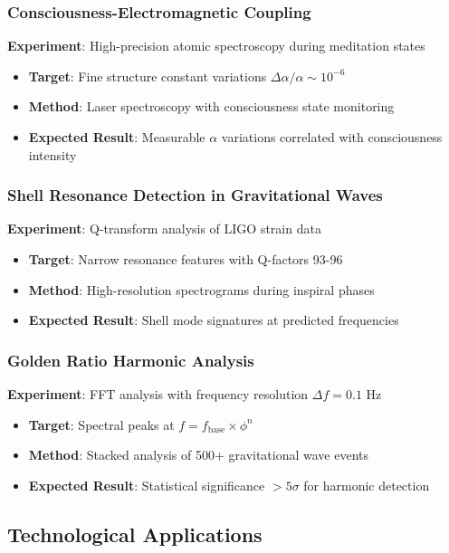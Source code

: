 \documentclass[12pt,a4paper]{article}
\theoremstyle{plain}
\theoremstyle{definition}
\begin{document}
\subsubsection{Consciousness-Electromagnetic Coupling}
\textbf{Experiment}: High-precision atomic spectroscopy during meditation states
\begin{itemize}
\item \textbf{Target}: Fine structure constant variations $\Delta\alpha/\alpha \sim 10^{-6}$
\item \textbf{Method}: Laser spectroscopy with consciousness state monitoring
\item \textbf{Expected Result}: Measurable $\alpha$ variations correlated with consciousness intensity
\end{itemize}

\subsubsection{Shell Resonance Detection in Gravitational Waves}
\textbf{Experiment}: Q-transform analysis of LIGO strain data
\begin{itemize}
\item \textbf{Target}: Narrow resonance features with Q-factors 93-96
\item \textbf{Method}: High-resolution spectrograms during inspiral phases
\item \textbf{Expected Result}: Shell mode signatures at predicted frequencies
\end{itemize}

\subsubsection{Golden Ratio Harmonic Analysis}
\textbf{Experiment}: FFT analysis with frequency resolution $\Delta f = 0.1$ Hz
\begin{itemize}
\item \textbf{Target}: Spectral peaks at $f = f_{\text{base}} \times \phi^n$
\item \textbf{Method}: Stacked analysis of 500+ gravitational wave events
\item \textbf{Expected Result}: Statistical significance $>5\sigma$ for harmonic detection
\end{itemize}

\subsection{Technological Applications}
\end{document}
